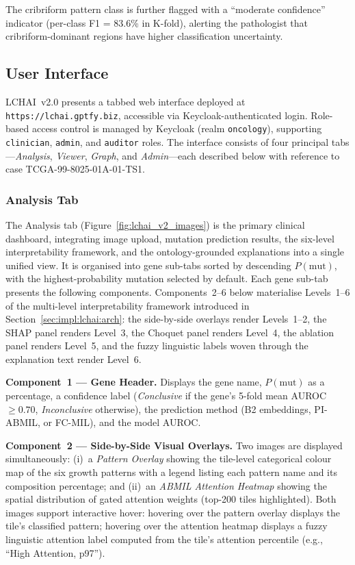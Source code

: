 The cribriform pattern class is further flagged with a ``moderate confidence'' indicator (per-class F1 = 83.6\% in K-fold), alerting the pathologist that cribriform-dominant regions have higher classification uncertainty.

\subsection{User Interface}
\label{sec:impl:lchai:ui}

LCHAI~v2.0 presents a tabbed web interface deployed at
\texttt{https://lchai.gptfy.biz}, accessible via Keycloak-authenticated
login.  Role-based access control is managed by Keycloak (realm
\texttt{oncology}), supporting \texttt{clinician}, \texttt{admin},
and \texttt{auditor} roles.
The interface consists of four principal tabs---\emph{Analysis},
\emph{Viewer}, \emph{Graph}, and
\emph{Admin}---each described below with reference to case
TCGA-99-8025-01A-01-TS1.

\subsubsection{Analysis Tab}
\label{sec:impl:lchai:ui:analysis}

The Analysis tab (Figure~\ref{fig:lchai_v2_images}) is the primary
clinical dashboard, integrating image upload, mutation prediction results,
the six-level interpretability framework, and the
ontology-grounded explanations into a single unified view.
It is organised into gene sub-tabs sorted by descending $P(\text{mut})$,
with the highest-probability mutation selected by default.
Each gene sub-tab presents the following components.
Components~2--6 below materialise Levels~1--6 of the
multi-level interpretability framework introduced in
Section~\ref{sec:impl:lchai:arch}: the side-by-side overlays render
Levels~1--2, the SHAP panel renders Level~3, the Choquet panel
renders Level~4, the ablation panel renders Level~5, and the fuzzy
linguistic labels woven through the explanation text render Level~6.

\textbf{Component~1 --- Gene Header.}
Displays the gene name, $P(\text{mut})$ as a percentage, a confidence
label (\emph{Conclusive} if the gene's 5-fold mean
AUROC~$\geq 0.70$, \emph{Inconclusive} otherwise), the prediction
method (B2 embeddings, PI-ABMIL, or FC-MIL), and the model AUROC.

\textbf{Component~2 --- Side-by-Side Visual Overlays.}
Two images are displayed simultaneously: (i)~a \emph{Pattern Overlay} showing the tile-level categorical colour map of the six growth patterns with a legend listing each pattern name and its composition percentage; and (ii)~an \emph{ABMIL Attention Heatmap} showing the spatial distribution of gated attention weights (top-200 tiles highlighted).
Both images support interactive hover: hovering over the pattern overlay displays the tile's classified pattern; hovering over the attention heatmap displays a fuzzy linguistic attention label computed from the tile's attention percentile (e.g., ``High Attention, p97'').

